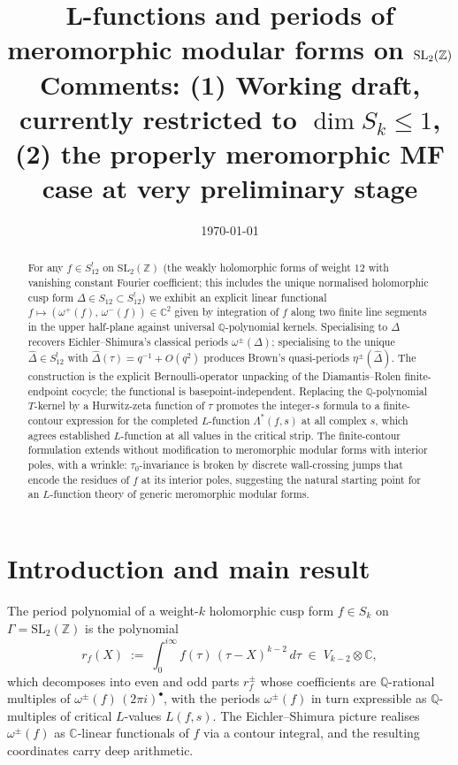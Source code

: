 \documentclass[11pt,letterpaper]{article}
\title{L-functions and periods of meromorphic modular forms on ${\rm SL}_2(\mathbb{Z})$\\Comments: (1) Working draft, currently restricted to $\dim S_k \leq 1$, \\ (2) the properly meromorphic MF case at very preliminary stage
       }
\author{}
\date{\today}
\newcommand{\ZZ}{\mathbb{Z}}
\newcommand{\QQ}{\mathbb{Q}}
\newcommand{\CC}{\mathbb{C}}
\newcommand{\SLZ}{\mathrm{SL}_2(\ZZ)}
\newcommand{\Dhat}{\widehat{\Delta}}
\begin{document}
\maketitle

\begin{abstract}
For any $f \in S_{12}^!$ on $\SLZ$ (the weakly holomorphic forms of weight
$12$ with vanishing constant Fourier coefficient; this includes the unique
normalised holomorphic cusp form $\Delta \in S_{12} \subset S_{12}^!$) we
exhibit an explicit linear functional
$f \mapsto (\omega^+(f),\,\omega^-(f)) \in \CC^2$ given by integration of
$f$ along two finite line segments in the upper half-plane against
universal $\QQ$-polynomial kernels.  Specialising to $\Delta$ recovers
Eichler--Shimura's classical periods $\omega^\pm(\Delta)$; specialising
to the unique $\Dhat \in S_{12}^!$ with $\Dhat(\tau) = q^{-1} + O(q^2)$
produces Brown's quasi-periods $\eta^\pm(\Dhat)$.  The construction is the explicit
Bernoulli-operator unpacking of the Diamantis--Rolen finite-endpoint
cocycle; the functional is basepoint-independent.  Replacing the $\QQ$-polynomial $T$-kernel
by a Hurwitz-zeta function of $\tau$ promotes the integer-$s$ formula
to a finite-contour expression for the completed $L$-function
$\Lambda^*(f, s)$ at all complex $s$, which agrees established $L$-function at 
all values in the critical strip.  The finite-contour formulation extends without
modification to meromorphic modular forms with interior poles, with a wrinkle: 
$\tau_0$-invariance is broken by discrete wall-crossing jumps that encode the 
residues of $f$ at its interior poles, suggesting the natural starting point for an 
$L$-function theory of generic meromorphic modular forms.
\end{abstract}

\section{Introduction and main result}\label{sec:intro}

The period polynomial of a weight-$k$ holomorphic cusp form $f \in S_k$
on $\Gamma = \SLZ$ is the polynomial
\[
  r_f(X) \;:=\; \int_0^{i\infty}\! f(\tau)\,(\tau - X)^{k-2}\,d\tau
              \;\in\; V_{k-2}\otimes\CC,
\]
which decomposes into even and odd parts $r_f^\pm$ whose coefficients are
$\QQ$-rational multiples of $\omega^\pm(f)\,(2\pi i)^\bullet$, with the
periods $\omega^\pm(f)$ in turn expressible as $\QQ$-multiples of
critical $L$-values $L(f, s)$.  The Eichler--Shimura picture realises
$\omega^\pm(f)$ as $\CC$-linear functionals of $f$ via a contour
integral, and the resulting coordinates carry deep arithmetic.
\end{document}
